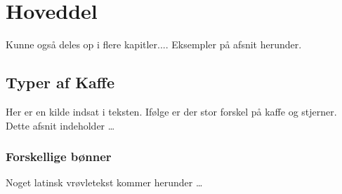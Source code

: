 
\chapter{Hoveddel}
\label{chap:hoved}

Kunne også deles op i flere kapitler.... Eksempler på afsnit herunder.


\section{Typer af Kaffe}
\label{sec:intro_coffee}

Her er en kilde indsat i teksten. Ifølge \cite{kww} er der stor forskel på kaffe
og stjerner. Dette afsnit indeholder \ldots


\subsection{Forskellige bønner}
\label{sec:intro_coffee_beans}

Noget latinsk vrøvletekst kommer herunder \ldots

\lipsum